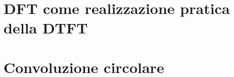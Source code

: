 \documentclass[../main.tex]{subfiles}
\begin{document}
\clearpage
\thispagestyle{empty}
\vspace*{7cm}
\section{DFT come realizzazione pratica della DTFT}
\vspace*{1.5cm}



\clearpage
\thispagestyle{empty}
\vspace*{7cm}
\section{Convoluzione circolare}
\vspace*{1.5cm}
\end{document}
